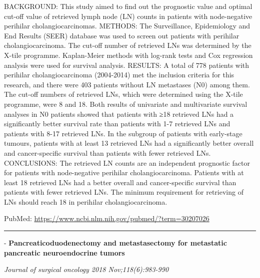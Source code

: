 \documentclass[]{article}
\begin{document}
BACKGROUND: This study aimed to find out the prognostic value and
optimal cut-off value of retrieved lymph node (LN) counts in patients
with node-negative perihilar cholangiocarcinomas. METHODS: The
Surveillance, Epidemiology and End Results (SEER) database was used to
screen out patients with perihilar cholangiocarcinoma. The cut-off
number of retrieved LNs was determined by the X-tile programme.
Kaplan-Meier methods with log-rank tests and Cox regression analysis
were used for survival analysis. RESULTS: A total of 778 patients with
perihilar cholangiocarcinoma (2004-2014) met the inclusion criteria for
this research, and there were 403 patients without LN metastases (N0)
among them. The cut-off numbers of retrieved LNs, which were determined
using the X-tile programme, were 8 and 18. Both results of univariate
and multivariate survival analyses in N0 patients showed that patients
with ≥18 retrieved LNs had a significantly better survival rate than
patients with 1-7 retrieved LNs and patients with 8-17 retrieved LNs. In
the subgroup of patients with early-stage tumours, patients with at
least 13 retrieved LNs had a significantly better overall and
cancer-specific survival than patients with fewer retrieved LNs.
CONCLUSIONS: The retrieved LN counts are an independent prognostic
factor for patients with node-negative perihilar cholangiocarcinoma.
Patients with at least 18 retrieved LNs had a better overall and
cancer-specific survival than patients with fewer retrieved LNs. The
minimum requirement for retrieving of LNs should reach 18 in perihilar
cholangiocarcinoma.

PubMed: \url{https://www.ncbi.nlm.nih.gov/pubmed/?term=30207026}

{}

{}

\begin{center}\rule{0.5\linewidth}{\linethickness}\end{center}

 - \textbf{Pancreaticoduodenectomy and metastasectomy for metastatic
pancreatic neuroendocrine tumors}

\emph{Journal of surgical oncology 2018 Nov;118(6):983-990}
\end{document}
